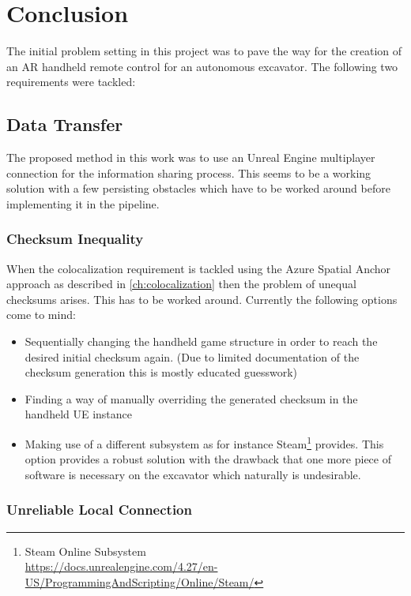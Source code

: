 \chapter{Conclusion}\label{sec:conclusion}

The initial problem setting in this project was to pave the way for the creation of an AR handheld remote control for an autonomous excavator. The following two requirements were tackled:

\section{Data Transfer}\label{sec:conc_data_transfer}
The proposed method in this work was to use an Unreal Engine multiplayer connection for the information sharing process. This seems to be a working solution with a few persisting obstacles which have to be worked around before implementing it in the pipeline. 

\subsection{Checksum Inequality}\label{subsec:checksum_error}

When the colocalization requirement is tackled using the Azure Spatial Anchor approach as described in \cref{ch:colocalization} then the problem of unequal checksums arises. This has to be worked around. Currently the following options come to mind:
\begin{itemize}
    \item Sequentially changing the handheld game structure in order to reach the desired initial checksum again. (Due to limited documentation of the checksum generation this is mostly educated guesswork)
    \item Finding a way of manually overriding the generated checksum in the handheld UE instance
    \item Making use of a different subsystem as for instance Steam\footnote{Steam Online Subsystem\\ \url{https://docs.unrealengine.com/4.27/en-US/ProgrammingAndScripting/Online/Steam/}} provides. This option provides a robust solution with the drawback that one more piece of software is necessary on the excavator which naturally is undesirable.
\end{itemize}

\subsection{Unreliable Local Connection}\label{subsec:unrealiable_connection}

